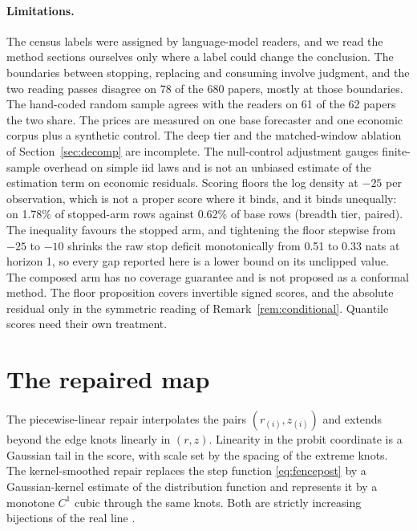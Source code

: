 \documentclass[11pt]{article}
\theoremstyle{remark}
\begin{document}
\paragraph{Limitations.} The census labels were assigned by
language-model readers, and we read the method sections ourselves only where a label
could change the conclusion. The boundaries between stopping, replacing and consuming
involve judgment, and the two reading passes disagree on 78 of the 680 papers,
mostly at those boundaries. The hand-coded random sample agrees with the readers on 61 of the
62 papers the two share. The prices are
measured on one base forecaster and one economic corpus plus a synthetic
control. The deep tier and the matched-window ablation of
Section~\ref{sec:decomp} are incomplete. The null-control adjustment gauges finite-sample overhead on
simple iid laws and is not an unbiased estimate of the estimation term on
economic residuals. Scoring floors the log density at $-25$ per observation, which is not a
proper score where it binds, and it binds unequally: on 1.78\% of stopped-arm
rows against 0.62\% of base rows (breadth tier, paired). The inequality favours the
stopped arm, and tightening the floor stepwise from $-25$ to $-10$ shrinks
the raw stop deficit monotonically from 0.51 to 0.33 nats at horizon 1, so
every gap reported here is a lower bound on its unclipped value. The composed arm has no coverage
guarantee and is not proposed as a conformal method. The floor proposition covers invertible signed scores, and the absolute residual
only in the symmetric reading of Remark~\ref{rem:conditional}. Quantile scores need
their own treatment.

\appendix

\section{The repaired map}\label{app:repair}

The piecewise-linear repair interpolates the pairs $(r_{(i)},z_{(i)})$ and extends
beyond the edge knots linearly in $(r,z)$. Linearity in the probit coordinate is a
Gaussian tail in the score, with scale set by the spacing of the extreme knots. The
kernel-smoothed repair replaces the step function \eqref{eq:fencepost} by a
Gaussian-kernel estimate of the distribution function and represents it by a
monotone $C^1$ cubic through the same knots. Both are strictly increasing
bijections of the real line \citep{cotton2026grammar}.
\end{document}
